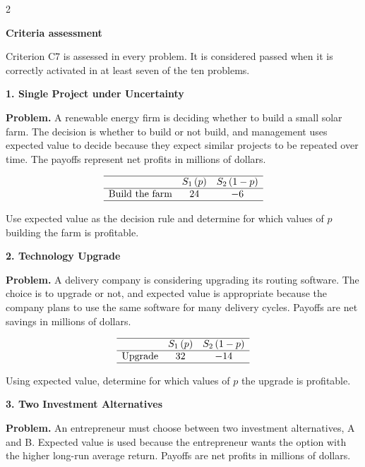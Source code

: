 \documentclass[12pt]{article}
\newcommand{\SubsectionBox}[1]{%
	\noindent\colorbox{gray!30}{%
		\parbox{\linewidth}{\textbf{#1}}%
	}\par\vspace{0.35cm}%
}
\begin{document}
	\begin{multicols}{2}
		
		\SubsectionBox{Criteria assessment}\vspace{-0.25cm}
		Criterion C7 is assessed in every problem. It is considered passed when it is correctly activated in at least seven of the ten problems.
		\vspace{0.25cm}
		\SubsectionBox{1. Single Project under Uncertainty}\vspace{-0.25cm}
		\textbf{Problem.}
		A renewable energy firm is deciding whether to build a small solar farm. The decision is whether to build or not build, and management uses expected value to decide because they expect similar projects to be repeated over time. The payoffs represent net profits in millions of dollars.
		
		\[
		\begin{array}{lcc}
			\hline
			& S_1\,(p) & S_2\,(1-p) \\
			\hline
			\text{Build the farm} & 24 & -6 \\
			\hline
		\end{array}
		\]
		
		Use expected value as the decision rule and determine for which values of \(p\) building the farm is profitable.
		
		\vspace{0.25cm}
		\SubsectionBox{2. Technology Upgrade}\vspace{-0.25cm}
		\textbf{Problem.}
		A delivery company is considering upgrading its routing software. The choice is to upgrade or not, and expected value is appropriate because the company plans to use the same software for many delivery cycles. Payoffs are net savings in millions of dollars.
		
		\[
		\begin{array}{lcc}
			\hline
			& S_1\,(p) & S_2\,(1-p) \\
			\hline
			\text{Upgrade} & 32 & -14 \\
			\hline
		\end{array}
		\]
		
		Using expected value, determine for which values of \(p\) the upgrade is profitable.
		
		\vspace{0.25cm}
		\SubsectionBox{3. Two Investment Alternatives}\vspace{-0.25cm}
		\textbf{Problem.}
		An entrepreneur must choose between two investment alternatives, A and B. Expected value is used because the entrepreneur wants the option with the higher long-run average return. Payoffs are net profits in millions of dollars.
		

\end{multicols}
\end{document}

